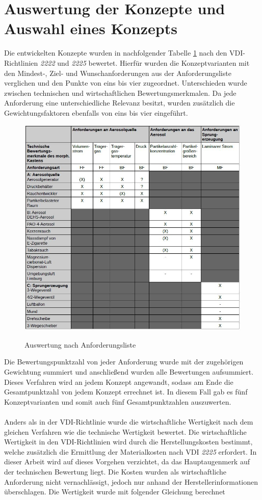 \section{Auswertung der Konzepte und Auswahl eines Konzepts}
Die entwickelten Konzepte wurden in nachfolgender Tabelle \ref{fig:TabEvalOne} nach den VDI-Richtlinien \textit{2222} und \textit{2225} bewertet. Hierf\"{u}r wurden die Konzeptvarianten mit den Mindest-, Ziel- und Wunschanforderungen aus der Anforderungsliste verglichen und den Punkte von eins bis vier zugeordnet. Unterschieden wurde zwischen technischen und wirtschaftlichen Bewertungsmerkmalen. Da jede Anforderung eine unterschiedliche Relevanz besitzt, wurden zus\"{a}tzlich die Gewichtungsfaktoren ebenfalls von eins bis vier eingef\"{u}hrt.
\begin{figure}[H]
        \myfloatalign
        {\includegraphics[width=.8\linewidth]{gfx/conclusion/TabEvalOne.jpg}} \quad
        \caption[Auswertung nach Anforderungsliste]
        {Auswertung nach Anforderungsliste}
        \label{fig:TabEvalOne}
\end{figure}
Die Bewertungspunktzahl von jeder Anforderung wurde mit der zugeh\"{o}rigen Gewichtung summiert und anschlie{\ss}end wurden alle Bewertungen aufsummiert. Dieses Verfahren wird an jedem Konzept angewandt, sodass am Ende die Gesamtpunktzahl von jedem Konzept errechnet ist. In diesem Fall gab es f\"{u}nf Konzeptvarianten und somit auch f\"{u}nf Gesamtpunktzahlen auszuwerten.
\\\\
Anders als in der VDI-Richtlinie wurde die wirtschaftliche Wertigkeit nach dem gleichen Verfahren wie die technische Wertigkeit bewertet. Die wirtschaftliche Wertigkeit in den VDI-Richtlinien wird durch die Herstellungskosten bestimmt, welche zus\"{a}tzlich die Ermittlung der Materialkosten nach VDI \textit{2225} erfordert. In dieser Arbeit wird auf dieses Vorgehen verzichtet, da das Hauptaugenmerk auf der technischen Bewertung liegt. Die Kosten wurden als wirtschaftliche Anforderung nicht vernachl\"{a}ssigt, jedoch nur anhand der Herstellerinformationen \"{u}berschlagen. Die Wertigkeit wurde mit folgender Gleichung berechnet
